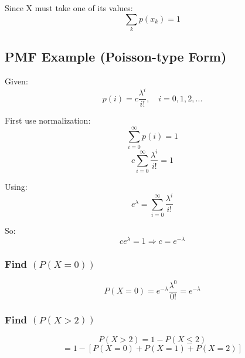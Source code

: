 \documentclass[12pt]{article}
\begin{document}
Since X must take one of its values:
\[
\sum_k p(x_k) = 1
\]

\subsection{PMF Example (Poisson-type Form)}

Given:
\[
p(i)=c\frac{\lambda^i}{i!}, \quad i=0,1,2,...
\]

First use normalization:
\[
\sum_{i=0}^{\infty} p(i)=1
\]
\[
c \sum_{i=0}^{\infty} \frac{\lambda^i}{i!}=1
\]

Using:
\[
e^\lambda = \sum_{i=0}^{\infty} \frac{\lambda^i}{i!}
\]

So:
\[
c e^\lambda = 1 \Rightarrow c = e^{-\lambda}
\]

\subsubsection*{Find $(P(X=0))$}

\[
P(X=0)=e^{-\lambda}\frac{\lambda^0}{0!}=e^{-\lambda}
\]

\subsubsection*{Find $(P(X>2))$}

\[
P(X>2)=1-P(X\le2)
\]
\[
=1-[P(X=0)+P(X=1)+P(X=2)]
\]
\end{document}
